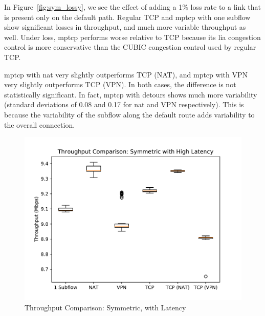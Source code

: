 \documentclass{cwru}
\begin{document}
In Figure~\ref{fig:sym_lossy}, we see the effect of adding a 1\% loss rate to a
link that is present only on the default path. Regular TCP and \ac{mptcp} with
one subflow show significant losses in throughput, and much more variable
throughput as well. Under loss, \ac{mptcp} performs worse relative to TCP
because its \ac{lia} congestion control is more conservative than the CUBIC
congestion control used by regular TCP.

\ac{mptcp} with \ac{nat} very slightly outperforms TCP (NAT), and \ac{mptcp}
with VPN very slightly outperforms TCP (VPN). In both cases, the difference is
not statistically significant. In fact, \ac{mptcp} with detours shows much more
variability (standard deviations of 0.08 and 0.17 for \ac{nat} and VPN
respectively). This is because the variability of the subflow along the default
route adds variability to the overall connection.


\begin{figure}[p]
  \centering
  \includegraphics[height=0.42\textheight]{figures/sym-delayed.pdf}
  \caption{Throughput Comparison: Symmetric, with Latency}
  \label{fig:sym_delayed}
\end{figure}
\end{document}
